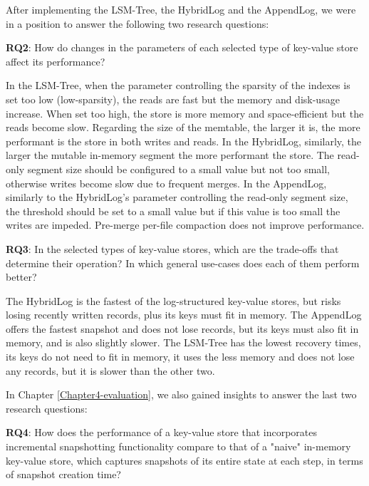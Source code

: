 After implementing the LSM-Tree, the HybridLog and the AppendLog, we were in a position to answer the following two research questions:

\begin{tcolorbox}
    \textbf{RQ2}: How do changes in the parameters of each selected type of key-value store affect its performance?
\end{tcolorbox}

In the LSM-Tree, when the parameter controlling the sparsity of the indexes is set too low (low-sparsity), the reads are fast but the memory and disk-usage increase. When set too high, the store is more memory and space-efficient but the reads become slow.
Regarding the size of the memtable, the larger it is, the more performant is the store in both writes and reads. In the HybridLog, similarly, the larger the mutable in-memory segment the more performant the store. The read-only segment size should be configured to a small value but not too small, otherwise writes become slow due to frequent merges.
In the AppendLog, similarly to the HybridLog's parameter controlling the read-only segment size, the threshold should be set to a small value but if this value is too small the writes are impeded. Pre-merge per-file compaction does not improve performance.

\begin{tcolorbox}
    \textbf{RQ3}: In the selected types of key-value stores, which are the trade-offs that determine their operation? In which general use-cases does each of them perform better?
\end{tcolorbox}

The HybridLog is the fastest of the log-structured key-value stores, but risks losing recently written records, plus its keys must fit in memory. The AppendLog offers the fastest snapshot and does not lose records, but its keys must also fit in memory, and is also slightly slower. The LSM-Tree has the lowest recovery times, its keys do not need to fit in memory, it uses the less memory and does not lose any records, but it is slower than the other two.

In Chapter \ref{Chapter4-evaluation}, we also gained insights to answer the last two research questions:

\begin{tcolorbox}
    \textbf{RQ4}: How does the performance of a key-value store that incorporates incremental snapshotting functionality compare to that of a "naive" in-memory key-value store, which captures snapshots of its entire state at each step, in terms of snapshot creation time?
\end{tcolorbox}

